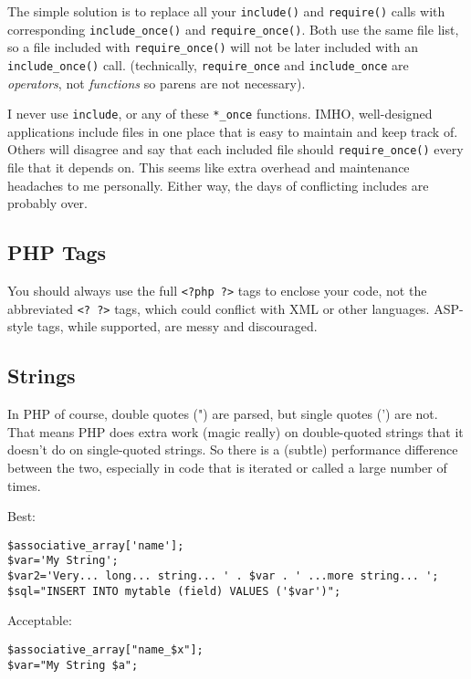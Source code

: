         The simple solution is to replace all your \texttt{include()} and \texttt{require()} calls with corresponding
        \texttt{include\_once()} and \texttt{require\_once()}. Both use the same file list, so a file included with
        \texttt{require\_once()} will not be later included with an \texttt{include\_once()} call. (technically,
        \texttt{require\_once} and \texttt{include\_once} are \emph{operators}, not \emph{functions} so parens are not necessary).

        I never use \texttt{include}, or any of these \texttt{*\_once} functions. IMHO, well-designed applications include
        files in one place that is easy to maintain and keep track of. Others will disagree and say that each included file
        should \texttt{require\_once()} every file that it depends on. This seems like extra overhead and maintenance headaches
        to me personally. Either way, the days of conflicting includes are probably over.

    \subsection{PHP Tags}
        You should always use the full \texttt{<?php ?>} tags to enclose your code, not the abbreviated \texttt{<? ?>} tags,
        which could conflict with XML or other languages. ASP-style tags, while supported, are messy and discouraged.

    \subsection{Strings}
        In PHP of course, double quotes (") are parsed, but single quotes (') are not. That means PHP does extra work
        (magic really) on double-quoted strings that it doesn't do on single-quoted strings. So there is a (subtle)
        performance difference between the two, especially in code that is iterated or called a large number of times.
        \begin{description}
            \item{Best:}
\begin{lstlisting}[stepnumber=0,frame={}]
$associative_array['name'];
$var='My String';
$var2='Very... long... string... ' . $var . ' ...more string... ';
$sql="INSERT INTO mytable (field) VALUES ('$var')";
\end{lstlisting}
            \item{Acceptable:}
\begin{lstlisting}[stepnumber=0,frame={}]
$associative_array["name_$x"];
$var="My String $a";
\end{lstlisting}
        \end{description}

